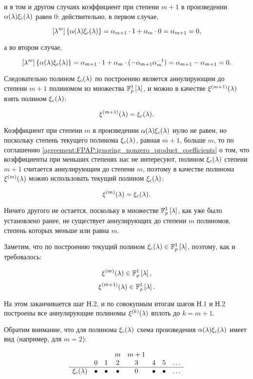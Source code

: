 и в том и другом случаях коэффициент при степени $m+1$ в произведении $\alpha (\lambda) \xi_c (\lambda)$ равен 0:
действительно, в первом случае,

	$$ \left [ \lambda^{m} \right ] \left \{ \alpha (\lambda) \xi_c (\lambda) \right \} = \alpha_{m+1} \cdot 1 + \alpha_m \cdot 0 = \alpha_{m+1} = 0, $$

а во втором случае,

	$$ \left [ \lambda^{m} \right ] \left \{ \alpha (\lambda) \xi_c (\lambda) \right \}
		= \alpha_{m+1} \cdot 1 + \alpha_m \cdot ( - \alpha_{m+1} \alpha_m^{-1} )
		= \alpha_{m+1} - \alpha_{m+1} = 0. $$

Следовательно полином $\xi_c (\lambda)$ по построению является аннулирующим до степени $m+1$ полиномом из множества $\mathbb{F}_p^1 \left [ \lambda \right ]$,
и можно в качестве $\xi^{(m+1)} (\lambda)$ взять полином $\xi_c (\lambda)$:

	$$ \xi^{(m+1)} (\lambda) = \xi_c (\lambda). $$

Коэффициент при степени $m$ в произведении $\alpha (\lambda) \xi_c (\lambda)$ нулю не равен, но поскольку степень текущего
полинома $\xi_c (\lambda)$, равная $m+1$, больше $m$, то по соглашению \ref{agreement:FPAP:ignoring_nonzero_product_coefficients} о том,
что коэффициенты при меньших степенях нас не интересуют, полином $\xi_c (\lambda)$ степени $m+1$ считается аннулирующим до степени $m$,
поэтому в качестве полинома $\xi^{(m)} (\lambda)$ можно использовать текущий полином $\xi_c (\lambda)$:

	$$ \xi^{(m)} (\lambda) = \xi_c (\lambda). $$

Ничего другого не остается, поскольку в множестве $\mathbb{F}_p^1 \left [ \lambda \right ]$, как уже было установлено ранее, не существует аннулирующих до
степени $m$ полиномов, степень которых меньше или равна $m$.

Заметим, что по построению текущий полином $\xi_c (\lambda) \in \mathbb{F}_p^1 \left [ \lambda \right ]$, поэтому, как и требовалось:

	$$ \xi^{(m)} (\lambda) \in \mathbb{F}_p^1 \left [ \lambda \right ], $$
	$$ \xi^{(m+1)} (\lambda) \in \mathbb{F}_p^1 \left [ \lambda \right ]. $$

На этом заканчивается шаг Н.2, и по совокупным итогам шагов Н.1 и Н.2 построены все аннулирующие полиномы $\xi^{(k)} (\lambda)$ вплоть
до $k = m+1$.

Обратим внимание, что для полинома $\xi_c (\lambda)$ схема произведения $\alpha (\lambda) \xi_c (\lambda)$ имеет вид
(например, для $m=2$):

	$$
		\begin{array}{cccccccc}
			                   &         &         & m       & m+1 &         &         & \\
			                   & 0       & 1       & 2       & 3   & 4       & 5       & \dots \\
			\hline
			\xi_c (\lambda) & \bullet & \bullet & \bullet & 0   & \bullet & \bullet & \dots \\
		\end{array}
	$$


